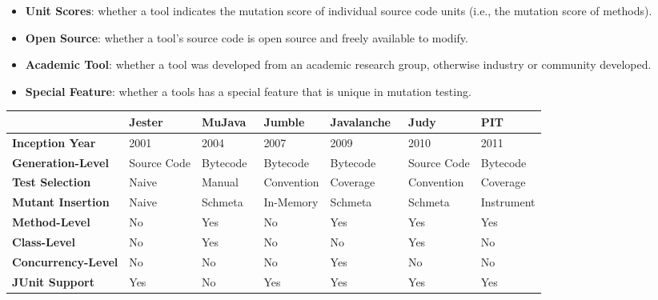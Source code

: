 \begin{itemize}
  \item \textbf{Unit Scores}: whether a tool indicates the mutation score of individual source code units (i.e., the mutation score of methods).
  \item \textbf{Open Source}: whether a tool's source code is open source and freely available to modify.
  \item \textbf{Academic Tool}: whether a tool was developed from an academic research group, otherwise industry or community developed.
  \item \textbf{Special Feature}: whether a tools has a special feature that is unique in mutation testing.
\end{itemize}

\begin{landscape}
  \begin{table}[ht!]
    \centering
    \begin{threeparttable}
      \begin{tabular}{|l|l|l|l|l|l|l|}
        \rowcolor[RGB]{169,196,223}
        \hline & \textbf{Jester~\cite{Jester}} & \textbf{MuJava~\cite{MOK05}} & \textbf{Jumble~\cite{Jumble}} & \textbf{Javalanche~\cite{SZ09}} & \textbf{Judy~\cite{MR10}} & \textbf{PIT~\cite{PIT}} \\
        \hline \cellcolor[RGB]{169,196,223} \textbf{Inception Year} & 2001 & 2004 & 2007 & 2009 & 2010 & 2011 \\
        \hline \cellcolor[RGB]{169,196,223} \textbf{Generation-Level} & Source Code & Bytecode & Bytecode & Bytecode & Source Code & Bytecode \\
        \hline \cellcolor[RGB]{169,196,223} \textbf{Test Selection} & Naive\tnote{f} & Manual & Convention & Coverage & Convention & Coverage \\
        \hline \cellcolor[RGB]{169,196,223} \textbf{Mutant Insertion} & Naive\tnote{f} & Schmeta & In-Memory & Schmeta & Schmeta\tnote{c} & Instrument \\
        \hline \cellcolor[RGB]{169,196,223} \textbf{Method-Level} & No & Yes & No & Yes & Yes & Yes \\
        \hline \cellcolor[RGB]{169,196,223} \textbf{Class-Level} & No & Yes & No & No & Yes\tnote{b} & No \\
        \hline \cellcolor[RGB]{169,196,223} \textbf{Concurrency-Level} & No & No & No & Yes & No & No \\
        \hline \cellcolor[RGB]{169,196,223} \textbf{JUnit Support} & Yes & No\tnote{c} & Yes & Yes & Yes & Yes \\

\end{tabular}
\end{threeparttable}
\end{table}
\end{landscape}
